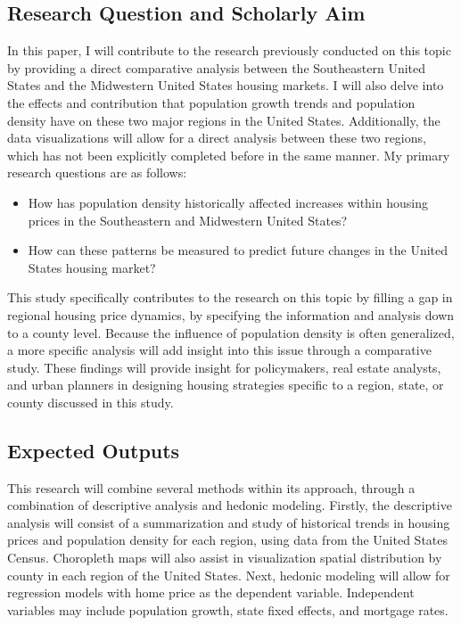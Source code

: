 \documentclass[journal,article,submit,pdftex,moreauthors]{Definitions/mdpi}
\begin{document}
\subsection{Research Question and Scholarly Aim}

In this paper, I will contribute to the research previously conducted on this topic by providing a direct comparative analysis between the Southeastern United States and the Midwestern United States housing markets. I will also delve into the effects and contribution that population growth trends and population density have on these two major regions in the United States. Additionally, the data visualizations will allow for a direct analysis between these two regions, which has not been explicitly completed before in the same manner. My primary research questions are as follows:

\begin{itemize}
    \item How has population density historically affected increases within housing prices in the Southeastern and Midwestern United States?
    \item How can these patterns be measured to predict future changes in the United States housing market?
\end{itemize}

This study specifically contributes to the research on this topic by filling a gap in regional housing price dynamics, by specifying the information and analysis down to a county level. Because the influence of population density is often generalized, a more specific analysis will add insight into this issue through a comparative study. These findings will provide insight for policymakers, real estate analysts, and urban planners in designing housing strategies specific to a region, state, or county discussed in this study.

\subsection{Expected Outputs}

This research will combine several methods within its approach, through a combination of descriptive analysis and hedonic modeling. Firstly, the descriptive analysis will consist of a summarization and study of historical trends in housing prices and population density for each region, using data from the United States Census. Choropleth maps will also assist in visualization spatial distribution by county in each region of the United States. Next, hedonic modeling will allow for regression models with home price as the dependent variable. Independent variables may include population growth, state fixed effects, and mortgage rates.
\end{document}
